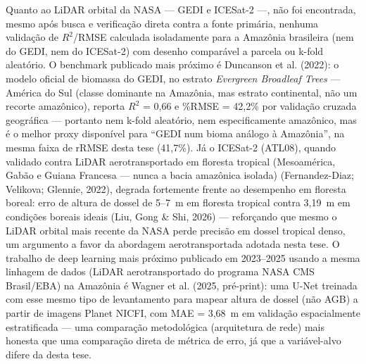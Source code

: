 Quanto ao LiDAR orbital da NASA --- GEDI e ICESat-2 ---, não foi encontrada, mesmo
após busca e verificação direta contra a fonte primária, nenhuma validação de
$R^2$/RMSE calculada isoladamente para a Amazônia brasileira (nem do GEDI, nem do
ICESat-2) com desenho comparável a parcela ou k-fold aleatório. O benchmark
publicado mais próximo é Duncanson et al. (2022): o modelo oficial de biomassa do
GEDI, no estrato \textit{Evergreen Broadleaf Trees} --- América do Sul (classe
dominante na Amazônia, mas estrato continental, não um recorte amazônico), reporta
$R^2$ = 0,66 e \%RMSE = 42,2\% por validação cruzada geográfica --- portanto nem
k-fold aleatório, nem especificamente amazônico, mas é o melhor proxy disponível
para ``GEDI num bioma análogo à Amazônia'', na mesma faixa de rRMSE desta tese
(41,7\%). Já o ICESat-2 (ATL08), quando validado contra LiDAR aerotransportado em
floresta tropical (Mesoamérica, Gabão e Guiana Francesa --- nunca a bacia
amazônica isolada) (Fernandez-Diaz; Velikova; Glennie, 2022), degrada fortemente frente ao desempenho em floresta boreal:
erro de altura de dossel de 5--7~m em floresta tropical contra 3,19~m em condições
boreais ideais (Liu, Gong \& Shi, 2026) --- reforçando que mesmo o LiDAR orbital
mais recente da NASA perde precisão em dossel tropical denso, um argumento a favor
da abordagem aerotransportada adotada nesta tese. O trabalho de deep learning mais
próximo publicado em 2023--2025 usando a mesma linhagem de dados (LiDAR
aerotransportado do programa NASA CMS Brasil/EBA) na Amazônia é Wagner et al.
(2025, pré-print): uma U-Net treinada com esse mesmo tipo de levantamento para
mapear altura de dossel (não AGB) a partir de imagens Planet NICFI, com
MAE = 3,68~m em validação espacialmente estratificada --- uma comparação
metodológica (arquitetura de rede) mais honesta que uma comparação direta de
métrica de erro, já que a variável-alvo difere da desta tese.

